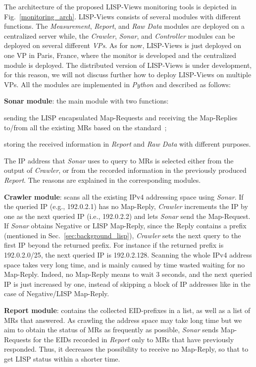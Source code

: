 The architecture of the proposed LISP-Views monitoring tools is depicted in Fig.~\ref{monitoring_arch}.  LISP-Views consists of several modules with different functions. The \emph{Measurement}, \emph{Report}, and \emph{Raw Data} modules are deployed on a centralized server while, the \emph{Crawler}, \emph{Sonar}, and \emph{Controller} modules can be deployed on several different \emph{VPs}.  As for now, LISP-Views is just deployed on one VP in Paris, France, where the monitor is developed and the centralized module is deployed. %
The distributed version of LISP-Views is under development, for this reason, we will not discuss further how to deploy LISP-Views on multiple VPs. All the modules are implemented in \emph{Python} and described as follows:

\textbf{Sonar module}: the main module with two functions:
\begin{enumerate*}
   \item sending the LISP encapsulated Map-Requests and receiving the Map-Replies to/from all the existing MRs based on the standard~\cite{rfc6830};
   \item storing the received information in \emph{Report} and \emph{Raw Data} with different purposes.
\end{enumerate*}

The IP address that \emph{Sonar} uses to query to MRs is selected  either from the output of \emph{Crawler}, or from the recorded information in the previously produced \emph{Report}. The reasons are explained in the corresponding modules.

\textbf{Crawler module}: scans all the existing IPv4 addressing space using \emph{Sonar}.  If the queried IP (e.g., 192.0.2.1) has no Map-Reply, \emph{Crawler} increments the IP by one as the next queried IP (i.e., 192.0.2.2) and lets \emph{Sonar} send the Map-Request. If \emph{Sonar} obtains Negative or LISP Map-Reply, since the Reply contains a prefix (mentioned in Sec.~\ref{sec:background_lisp}), \emph{Crawler} sets the next query to the first IP beyond the returned prefix.  For instance if the returned prefix is 192.0.2.0/25, the next queried IP is 192.0.2.128.  Scanning the whole IPv4 address space takes very long time, and is mainly caused by time wasted waiting for no Map-Reply.  Indeed, no Map-Reply means to wait 3 seconds, and the next queried IP is just increased by one, instead of skipping a block of IP addresses like in the case of Negative/LISP Map-Reply.

\textbf{Report module}: contains the collected EID-prefixes in a list, as well as a list of MRs that answered. As crawling the address space may take long time but we aim to obtain the status of MRs as frequently as possible, \emph{Sonar} sends Map-Requests for the EIDs recorded in \emph{Report} only to MRs that have previously responded. Thus, it decreases the possibility to receive no Map-Reply, so that to get LISP status within a shorter time.

